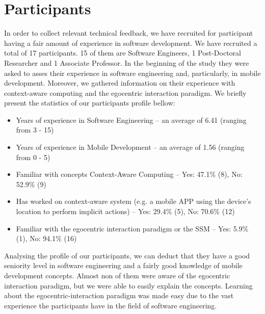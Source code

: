 \section{Participants} %
\label{sec:eval_participants}
In order to collect relevant technical feedback, we have recruited for participant having a fair amount of experience in software development. We have recruited a total of 17 participants. 15 of them are Software Engineers, 1 Post-Doctoral Researcher and 1 Associate Professor. In the beginning of the study they were asked to asses their experience in software engineering and, particularly, in mobile development. Moreover, we gathered information on their experience with context-aware computing and the egocentric interaction paradigm. We briefly present the statistics of our participants profile bellow:
\begin{itemize}
	\item Years of experience in Software Engineering -- an average of 6.41 (ranging from 3 - 15)
	\item Years of experience in Mobile Development -- an average of 1.56 (ranging from 0 - 5)
	\item Familiar with concepts Context-Aware Computing -- Yes: 47.1\% (8), No: 52.9\% (9)
	\item Has worked on context-aware system (e.g. a mobile APP using the device's location to perform implicit actions) -- Yes: 29.4\% (5), No: 70.6\% (12)
	\item Familiar with the egocentric interaction paradigm or the SSM -- Yes: 5.9\% (1), No: 94.1\% (16)
\end{itemize}

Analysing the profile of our participants, we can deduct that they have a good seniority level in software engineering and a fairly good knowledge of mobile development concepts. Almost non of them were aware of the egocentric interaction paradigm, but we were able to easily explain the concepts. Learning about the egocentric-interaction paradigm was made easy due to the vast experience the participants have in the field of software engineering.
